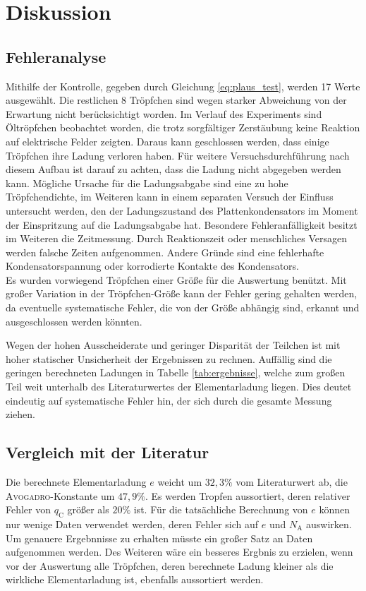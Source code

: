 \newpage
\section{Diskussion}
\label{sec:Diskussion}

\subsection{Fehleranalyse}
Mithilfe der Kontrolle, gegeben durch Gleichung \eqref{eq:plaus_test}, werden 17 Werte ausgewählt.
Die restlichen 8 Tröpfchen sind wegen starker Abweichung von der Erwartung nicht berücksichtigt worden.
Im Verlauf des Experiments sind Öltröpfchen beobachtet worden, die trotz sorgfältiger Zerstäubung keine Reaktion auf elektrische Felder zeigten. 
Daraus kann geschlossen werden, dass einige Tröpfchen ihre Ladung verloren haben.
Für weitere Versuchsdurchführung nach diesem Aufbau ist darauf zu achten, dass die Ladung nicht abgegeben werden kann.
Mögliche Ursache für die Ladungsabgabe sind eine zu hohe Tröpfchendichte,
im Weiteren kann in einem separaten Versuch der Einfluss untersucht werden, 
den der Ladungszustand des Plattenkondensators im Moment der Einspritzung auf die Ladungsabgabe hat.
Besondere Fehleranfälligkeit besitzt im Weiteren die Zeitmessung. Durch Reaktionszeit oder menschliches Versagen werden falsche Zeiten aufgenommen. Andere Gründe sind eine fehlerhafte Kondensatorspannung oder korrodierte Kontakte des Kondensators.\\
Es wurden vorwiegend Tröpfchen einer Größe für die Auswertung benützt.
Mit großer Variation in der Tröpfchen-Größe kann der Fehler gering gehalten werden, da eventuelle systematische Fehler, die von der Größe abhängig sind, erkannt und ausgeschlossen werden könnten.

Wegen der hohen Ausscheiderate und geringer Disparität der Teilchen ist mit hoher statischer Unsicherheit der Ergebnissen zu rechnen.
Auffällig sind die geringen berechneten Ladungen in Tabelle \ref{tab:ergebnisse}, welche zum großen Teil weit unterhalb des Literaturwertes der Elementarladung liegen. Dies deutet eindeutig auf systematische Fehler hin, der sich durch die gesamte Messung ziehen. 


\subsection{Vergleich mit der Literatur}
Die berechnete Elementarladung $e$ weicht um $32,3\%$ vom Literaturwert ab, die \textsc{Avogadro}-Konstante um $47,9\%$. 
Es werden Tropfen aussortiert, deren relativer Fehler von $q_\mathup{C}$ größer als $20\%$ ist. Für die tatsächliche Berechnung von $e$ können nur wenige Daten verwendet werden, deren Fehler sich auf $e$ und $N_\mathup{A}$ auswirken. Um genauere Ergebnnisse zu erhalten müsste ein großer Satz an Daten aufgenommen werden. Des Weiteren wäre ein besseres Ergbnis zu erzielen, wenn vor der Auswertung alle Tröpfchen, deren berechnete Ladung kleiner als die wirkliche Elementarladung ist, ebenfalls aussortiert werden.
